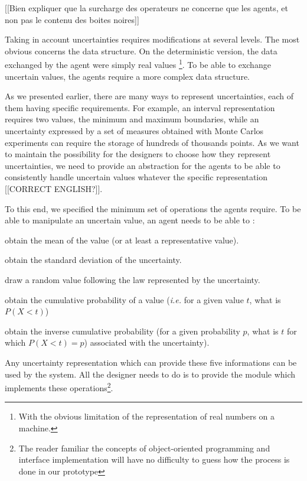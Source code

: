 [[Bien expliquer que la surcharge des operateurs ne concerne que les agents, et non pas le contenu des boites noires]]

Taking in account uncertainties requires modifications at several levels. The most obvious concerns the data structure. On the deterministic version, the data exchanged by the agent were simply real values \footnote{With the obvious limitation of the representation of real numbers on a machine.}. To be able to exchange uncertain values, the agents require a more complex data structure.

As we presented earlier, there are many ways to represent uncertainties, each of them having specific requirements. For example, an interval representation requires two values, the minimum and maximum boundaries, while an uncertainty expressed by a set of measures obtained with Monte Carlos experiments can require the storage of hundreds of thousands points. As we want to maintain the possibility for the designers to choose how they represent uncertainties, we need to provide an abstraction for the agents to be able to consistently handle uncertain values whatever the specific representation [[CORRECT ENGLISH?]].

To this end, we specified the minimum set of operations the agents require. To be able to manipulate an uncertain value, an agent needs to be able to :
\begin{compactitem}
\item obtain the mean of the value (or at least a representative value).
\item obtain the standard deviation of the uncertainty.
\item draw a random value following the law represented by the uncertainty.
\item obtain the cumulative probability of a value (\emph{i.e.} for a given value $t$, what is $P(X < t)$) 
\item obtain the inverse cumulative probability (for a given probability $p$, what is $t$ for which $P(X < t) = p$) associated with the uncertainty).
\end{compactitem}

Any uncertainty representation which can provide these five informations can be used by the system. All the designer needs to do is to provide the module which implements these operations\footnote{The reader familiar the concepts of object-oriented programming and interface implementation will have no difficulty to guess how the process is done in our prototype}.

